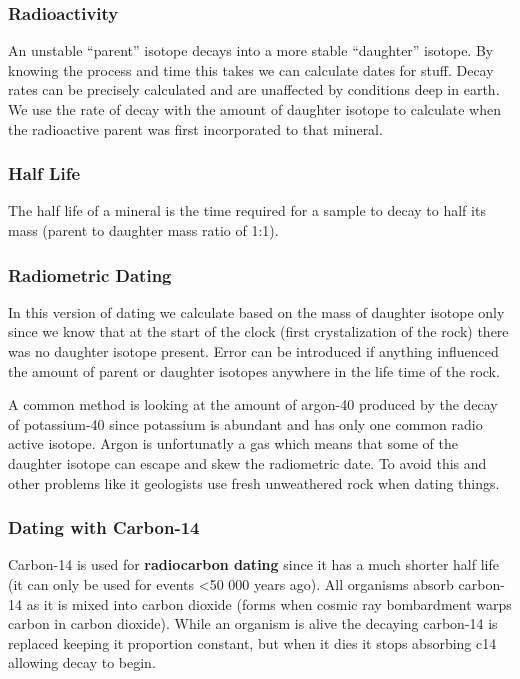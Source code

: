 \documentclass{article}
\begin{document}
\subsubsection{Radioactivity} %
\label{sub:radioactivity}
An unstable ``parent'' isotope decays into a more stable ``daughter'' isotope. By knowing the process and time this takes we can calculate dates for stuff. Decay rates can be precisely calculated and are unaffected by conditions deep in earth. We use the rate of decay with the amount of daughter isotope to calculate when the radioactive parent was first incorporated to that mineral.

\subsubsection{Half Life} %
\label{sub:half_life}
The half life of a mineral is the time required for a sample to decay to half its mass (parent to daughter mass ratio of 1:1).

\subsubsection{Radiometric Dating} %
\label{sub:radiometric_dating}
In this version of dating we calculate based on the mass of daughter isotope only since we know that at the start of the clock (first crystalization of the rock) there was no daughter isotope present. Error can be introduced if anything influenced the amount of parent or daughter isotopes anywhere in the life time of the rock.

A common method is looking at the amount of argon-40 produced by the decay of potassium-40 since potassium is abundant and has only one common radio active isotope. Argon is unfortunatly a gas which means that some of the daughter isotope can escape and skew the radiometric date. To avoid this and other problems like it geologists use fresh unweathered rock when dating things.

\subsubsection{Dating with Carbon-14} %
\label{sub:dating_with_carbo_14}
Carbon-14 is used for \textbf{radiocarbon dating} since it has a much shorter half life (it can only be used for events <50 000 years ago). All organisms absorb carbon-14 as it is mixed into carbon dioxide (forms when cosmic ray bombardment warps carbon in carbon dioxide). While an organism is alive the decaying carbon-14 is replaced keeping it proportion constant, but when it dies it stops absorbing c14 allowing decay to begin.
\end{document}
